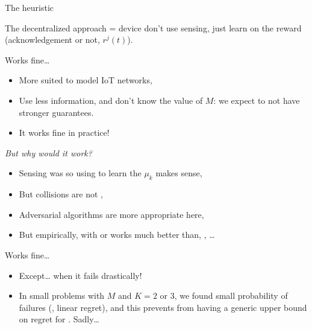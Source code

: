 \documentclass[12pt,english,ignorenonframetext,]{beamer}
\providecommand{\tightlist}{%
  \setlength{\itemsep}{0pt}\setlength{\parskip}{0pt}}
\begin{document}
\begin{frame}[allowframebreaks]{The \Selfish{} heuristic}

The \Selfish{} decentralized approach = device don't use sensing, just
learn on the reward (acknowledgement or not, \(r^j(t)\)).


\begin{block}{Works fine\ldots{}}

\begin{itemize}
\tightlist
\item
  More suited to model IoT networks,
\item
  Use less information, and don't know the value of \(M\): we expect
  \Selfish{} to not have stronger guarantees.
\item
  It works fine in practice!
\end{itemize}

\end{block}

\begin{block}{\emph{But why would it work?}}

\begin{itemize}
\tightlist
\item
  Sensing was \iid{} so using \UCB{} to learn the \(\mu_k\) makes sense,
\item
  But collisions are not \iid,
\item
  Adversarial algorithms are more appropriate here,
\item
  But empirically, \Selfish{} with \UCB{} or \klUCB{} works much better
  than, \eg, \ExpThree\ldots{}
\end{itemize}

\end{block}

\begin{block}{Works fine\ldots{}}

\begin{itemize}
\tightlist
\item
  Except\ldots{} when it fails drastically! \Sadey[1.3]
\item
  In small problems with \(M\) and \(K = 2\) or \(3\), we found small
  probability of failures (\ie, linear regret), and this prevents from
  having a generic upper bound on regret for \Selfish. Sadly\ldots{}
\end{itemize}

\end{block}

\end{frame}
\end{document}
